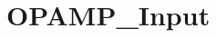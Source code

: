 \hypertarget{group___o_p_a_m_p___input}{\section{O\-P\-A\-M\-P\-\_\-\-Input}
\label{group___o_p_a_m_p___input}
}
